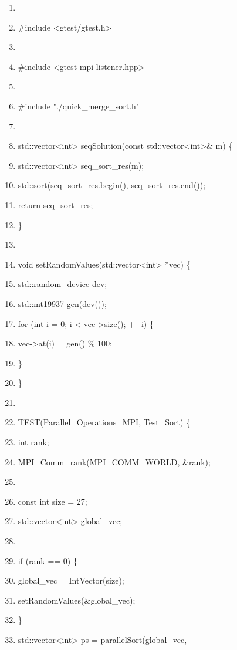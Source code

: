 \documentclass[]{article}
\begin{document}
\begin{enumerate}
\def\labelenumi{\arabic{enumi}.}
\setcounter{enumi}{1}
\item
\item
  \#include \textless{}gtest/gtest.h\textgreater{}
\item
\item
  \#include \textless{}gtest-mpi-listener.hpp\textgreater{}
\item
\item
  \#include "./quick\_merge\_sort.h"
\item
\item
  std::vector\textless{}int\textgreater{} seqSolution(const
  std::vector\textless{}int\textgreater{}\& m) \{
\item
  std::vector\textless{}int\textgreater{} seq\_sort\_res(m);
\item
  std::sort(seq\_sort\_res.begin(), seq\_sort\_res.end());
\item
  return seq\_sort\_res;
\item
  \}
\item
\item
  void setRandomValues(std::vector\textless{}int\textgreater{} *vec) \{
\item
  std::random\_device dev;
\item
  std::mt19937 gen(dev());
\item
  for (int i = 0; i \textless{} vec-\textgreater{}size(); ++i) \{
\item
  vec-\textgreater{}at(i) = gen() \% 100;
\item
  \}
\item
  \}
\item
\item
  TEST(Parallel\_Operations\_MPI, Test\_Sort) \{
\item
  int rank;
\item
  MPI\_Comm\_rank(MPI\_COMM\_WORLD, \&rank);
\item
\item
  const int size = 27;
\item
  std::vector\textless{}int\textgreater{} global\_vec;
\item
\item
  if (rank == 0) \{
\item
  global\_vec = IntVector(size);
\item
  setRandomValues(\&global\_vec);
\item
  \}
\item
  std::vector\textless{}int\textgreater{} ps = parallelSort(global\_vec,

\end{enumerate}
\end{document}
